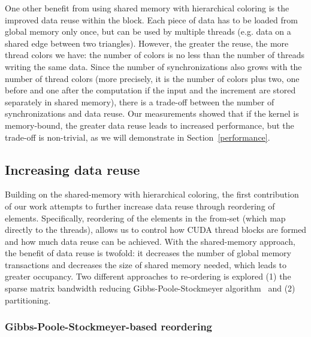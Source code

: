One other benefit from using shared memory with hierarchical coloring is the 
improved data reuse within the block. Each piece of data has to be loaded 
from global memory only once, but can be used by multiple threads (e.g. data on 
a shared edge between two triangles). However, the greater the reuse, the more 
thread colors we have: the number of colors is no less than the number of 
threads writing the same data. Since the number of synchronizations also grows 
with the number of thread colors (more precisely, it is the number of colors 
plus two, one before and one after the computation if the input and the 
increment are stored separately in shared memory), there is a trade-off between 
the number of synchronizations and data reuse. Our measurements showed that if 
the kernel is memory-bound, the greater data reuse leads to increased 
performance, but the trade-off is non-trivial, as we will demonstrate in 
Section~\ref{performance}.

\subsection{Increasing data reuse}\label{increasing-data-reuse}
\noindent Building on the shared-memory with hierarchical coloring, the first 
contribution of our work attempts to further increase data reuse through 
reordering of elements. Specifically, reordering of the elements in the
from-set (which map directly to the threads), allows us to control 
how CUDA thread blocks are formed and how much data reuse can be achieved. 
With the shared-memory approach, the benefit of data reuse is twofold: it 
decreases the number of global memory transactions and decreases the size of 
shared memory needed, which leads to greater occupancy. Two different 
approaches to re-ordering is explored (1) the sparse matrix bandwidth reducing 
Gibbs-Poole-Stockmeyer algorithm~\cite{gps} and (2) partitioning.


\subsubsection{Gibbs-Poole-Stockmeyer-based reordering}


